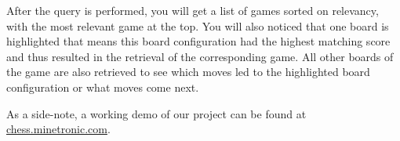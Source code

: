 \documentclass[11pt]{article}
\begin{document}
    After the query is performed, you will get a list of games sorted on relevancy, with the most relevant game at the top. You will also noticed that one board is highlighted that means this board configuration had the highest matching score and thus resulted in the retrieval of the corresponding game. All other boards of the game are also retrieved to see which moves led to the highlighted board configuration or what moves come next.

    As a side-note, a working demo of our project can be found at \href{http://chess.minetronic.com}{chess.minetronic.com}.

    

\end{document}
